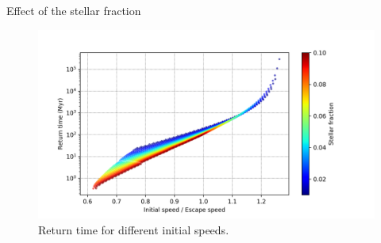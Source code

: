 \documentclass{beamer}
\begin{document}
\begin{frame}{Effect of the stellar fraction}
	\begin{figure}[h]
		\centering
		\includegraphics[width=\linewidth]{"../Files/Week 10/returntimes_speed"}
		\caption{Return time for different initial speeds.}
	\end{figure}
\end{frame}
\end{document}
